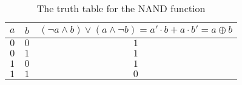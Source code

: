 \begin{table}[ht]
    \centering
    \begin{tabular}{cc|c}
        $a$ & $b$ & $(\lnot a \land b) \lor (a \land \lnot b) = a'\cdot b + a\cdot b' = a \oplus b$ \\
        \hline
        $0$ & $0$ & $1$ \\
        $0$ & $1$ & $1$ \\
        $1$ & $0$ & $1$ \\
        $1$ & $1$ & $0$ \\
    \end{tabular}
    \caption{The truth table for the NAND function}
\end{table}